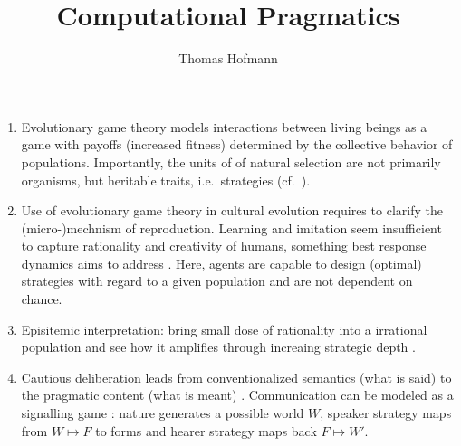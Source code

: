 \documentclass{article}
\author{Thomas Hofmann}
\title{Computational Pragmatics}
\begin{document}
\maketitle

\begin{enumerate}
\item Evolutionary game theory \cite{smith1982evolution} models interactions between living beings as a game with payoffs (increased fitness) determined by the collective behavior of populations. Importantly, the units of of natural selection are not primarily organisms, but heritable traits, i.e.~strategies (cf.~\cite{jager2007game}).
\item  Use of evolutionary game theory in cultural evolution requires to clarify the (micro-)mechnism of reproduction. Learning and imitation seem insufficient to capture rationality and creativity of humans, something best response dynamics aims to address \cite{jager2007game}. Here, agents are capable to design (optimal) strategies with regard to a given population and are not dependent on chance. 
\item Episitemic interpretation: bring small dose of rationality into a irrational population and see how it amplifies through increaing strategic depth \cite[Section 2.3]{jager2007game}.
\item Cautious deliberation leads from conventionalized semantics (what is said) to the pragmatic content (what is meant) \cite[Section 3]{jager2007game}. Communication can be modeled as a signalling game \cite{lewis2008convention,van2004signalling}: nature generates a possible world $W$, speaker strategy maps from $W \mapsto F$ to forms and hearer strategy maps back $F \mapsto W'$. 
\end{enumerate}



\end{document}
